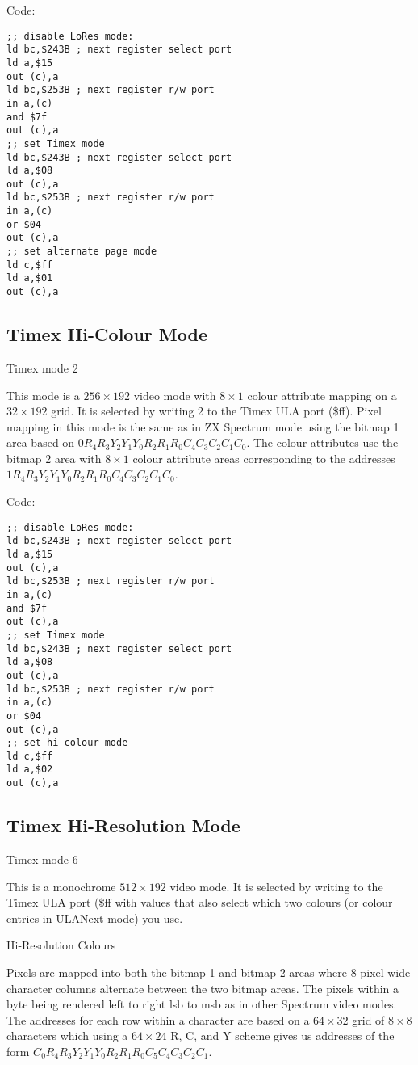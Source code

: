 Code:

\begin{verbatim}
;; disable LoRes mode:
ld bc,$243B ; next register select port
ld a,$15
out (c),a
ld bc,$253B ; next register r/w port
in a,(c)
and $7f
out (c),a
;; set Timex mode
ld bc,$243B ; next register select port
ld a,$08
out (c),a
ld bc,$253B ; next register r/w port
in a,(c)
or $04
out (c),a
;; set alternate page mode
ld c,$ff
ld a,$01
out (c),a
\end{verbatim}

\subsection{Timex Hi-Colour Mode}

Timex mode 2

This mode is a $256\times192$ video mode with $8\times1$ colour
attribute mapping on a $32\times192$ grid. It is selected by writing 2
to the Timex ULA port (\$ff).  Pixel mapping in this mode is the same
as in ZX Spectrum mode using the bitmap 1 area based on
$0R_4R_3Y_2Y_1Y_0R_2R_1R_0C_4C_3C_2C_1C_0$.  The colour attributes use
the bitmap 2 area with $8\times1$ colour attribute areas corresponding
to the addresses $1R_4R_3Y_2Y_1Y_0R_2R_1R_0C_4C_3C_2C_1C_0$.

Code:
\begin{verbatim}
;; disable LoRes mode:
ld bc,$243B ; next register select port
ld a,$15
out (c),a
ld bc,$253B ; next register r/w port
in a,(c)
and $7f
out (c),a
;; set Timex mode
ld bc,$243B ; next register select port
ld a,$08
out (c),a
ld bc,$253B ; next register r/w port
in a,(c)
or $04
out (c),a
;; set hi-colour mode
ld c,$ff
ld a,$02
out (c),a
\end{verbatim}

\subsection{Timex Hi-Resolution Mode}

Timex mode 6

This is a monochrome $512\times192$ video mode. It is selected by
writing to the Timex ULA port (\$ff with values that also select which
two colours (or colour entries in ULANext mode) you use.

\begin{table}[h]\centering
  \caption{Hi-Resolution Colours}
\end{table}
  
Pixels are mapped into both the bitmap 1 and bitmap 2 areas where
8-pixel wide character columns alternate between the two bitmap areas.
The pixels within a byte being rendered left to right lsb to msb as in
other Spectrum video modes.  The addresses for each row within a
character are based on a $64\times32$ grid of $8\times8$ characters
which using a $64\times24$ R, C, and Y scheme gives us addresses of
the form $C_0R_4R_3Y_2Y_1Y_0R_2R_1R_0C_5C_4C_3C_2C_1$.

